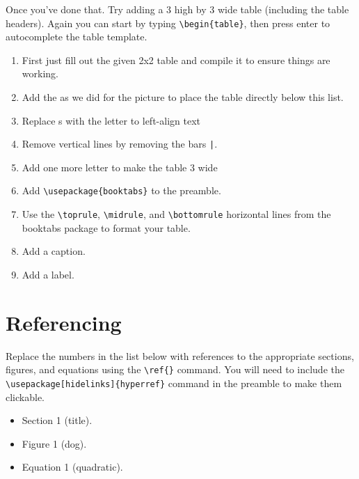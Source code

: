 
        Once you've done that. Try adding a 3 high by 3 wide table (including the table headers). Again you can start by typing
        \verb"\begin{table}", then press enter to autocomplete the table template.
        \begin{enumerate}
            \item First just fill out the given 2x2 table and compile it to ensure things are working.
            \item Add the  as we did for the picture to place the table directly below this list.
            \item Replace s with the letter  to left-align text
            \item Remove vertical lines by removing the bars \verb"|".
            \item Add one more letter  to make the table 3 wide
            \item Add \verb"\usepackage{booktabs}" to the preamble.
            \item Use the \verb"\toprule", \verb"\midrule", and \verb"\bottomrule" horizontal lines from the booktabs package to format your table.
            \item Add a caption.
            \item Add a label.
        \end{enumerate}


    \section{Referencing}
        Replace the numbers in the list below with references to the appropriate sections, figures, and equations using the \verb"\ref{}" command. You will need to include the \verb"\usepackage[hidelinks]{hyperref}" command in the preamble to make them clickable.


        \begin{itemize}
            \item Section 1 (title).
            \item Figure 1 (dog).
            \item Equation 1 (quadratic).
        \end{itemize}
        

        

        
        
    


